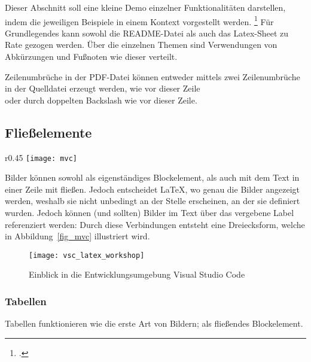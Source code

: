 Dieser Abschnitt soll eine kleine Demo einzelner Funktionalitäten darstellen, indem die jeweiligen Beispiele in einem Kontext vorgestellt werden.
\footcite[An dieser Stelle soll erneut auf die Lizenz hingewiesen werden. Siehe][]{ccOJlizenz}
Für Grundlegendes kann sowohl die README-Datei als auch das Latex-Sheet zu Rate gezogen werden. 
Über die einzelnen Themen sind Verwendungen von Abkürzungen und Fußnoten wie dieser verteilt. 

Zeilenumbrüche in der PDF-Datei können entweder mittels zwei Zeilenumbrüche in der Quelldatei erzeugt werden, wie vor dieser Zeile\\
oder durch doppelten Backslash wie vor dieser Zeile.

\subsection{Fließelemente}
  \begin{wrapfigure}{r}{0.45\linewidth}
    \centering
    \texttt{[image: mvc]}
    \caption[Aufbau von \acrlong{MVC}]{Aufbau von \gls{MVC}.\\Quelle: Angelehnt an \cite{curry2008flexible}}
    \label{fig_mvc}
  \end{wrapfigure}
    Bilder können sowohl als eigenständiges Blockelement, als auch mit dem Text in einer Zeile mit fließen.
    Jedoch entscheidet \LaTeX, wo genau die Bilder angezeigt werden, weshalb sie nicht unbedingt an der Stelle erscheinen,
    an der sie definiert wurden.
    Jedoch können (und sollten) Bilder im Text über das vergebene Label referenziert werden:
    Durch diese Verbindungen entsteht eine Dreiecksform, welche in Abbildung~\ref{fig_mvc} illustriert wird.

    \begin{figure}[tbh]
      \centering
      \texttt{[image: vsc\_latex\_workshop]}
      \caption{Einblick in die Entwicklungsumgebung Visual Studio Code}
      \label{fig_prototyp_desktop}
    \end{figure}

\subsubsection{Tabellen}
  Tabellen funktionieren wie die erste Art von Bildern; als fließendes Blockelement.

